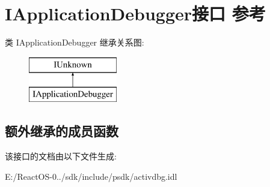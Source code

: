 \hypertarget{interface_i_application_debugger}{}\section{I\+Application\+Debugger接口 参考}
\label{interface_i_application_debugger}
类 I\+Application\+Debugger 继承关系图\+:\begin{figure}[H]
\begin{center}
\leavevmode
\includegraphics[height=2.000000cm]{interface_i_application_debugger}
\end{center}
\end{figure}
\subsection*{额外继承的成员函数}


该接口的文档由以下文件生成\+:\begin{DoxyCompactItemize}
\item 
E\+:/\+React\+O\+S-\/0../sdk/include/psdk/activdbg.\+idl\end{DoxyCompactItemize}
